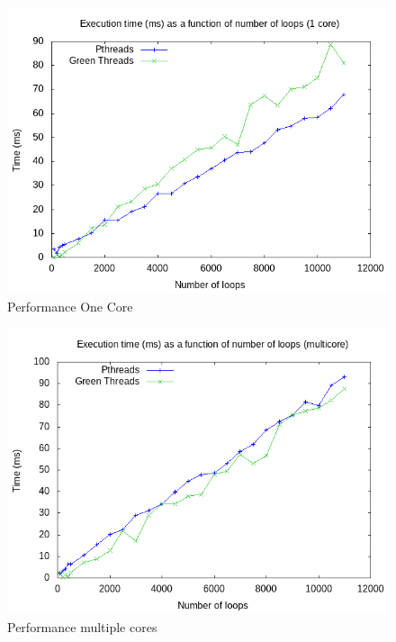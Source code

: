 \documentclass[12pt, letterpaper]{article}
\begin{document}
\begin{figure}[h]
    \center
    \includegraphics[scale=0.6]{unicore.png}
    \caption{Performance One Core}
    \label{fig:graph1}
\end{figure}

\begin{figure}[h]
    \center
    \includegraphics[scale=0.6]{multicore.png}
    \caption{Performance multiple cores }
    \label{fig:graph0}
\end{figure}
\end{document}
